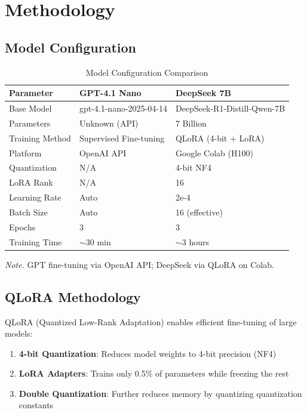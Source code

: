 \documentclass[11pt, a4paper]{article}
\begin{document}
\section{Methodology}

\subsection{Model Configuration}

\begin{table}[H]
\centering
\caption{Model Configuration Comparison}
\label{tab:model_config}
\begin{tabular}{lll}
\toprule
\textbf{Parameter} & \textbf{GPT-4.1 Nano} & \textbf{DeepSeek 7B} \\
\midrule
Base Model & gpt-4.1-nano-2025-04-14 & DeepSeek-R1-Distill-Qwen-7B \\
Parameters & Unknown (API) & 7 Billion \\
Training Method & Supervised Fine-tuning & QLoRA (4-bit + LoRA) \\
Platform & OpenAI API & Google Colab (H100) \\
Quantization & N/A & 4-bit NF4 \\
LoRA Rank & N/A & 16 \\
Learning Rate & Auto & 2e-4 \\
Batch Size & Auto & 16 (effective) \\
Epochs & 3 & 3 \\
Training Time & $\sim$30 min & $\sim$3 hours \\
\bottomrule
\end{tabular}

\vspace{0.5em}
\footnotesize\textit{Note.} GPT fine-tuning via OpenAI API; DeepSeek via QLoRA on Colab.
\end{table}

\subsection{QLoRA Methodology}

QLoRA (Quantized Low-Rank Adaptation) enables efficient fine-tuning of large models:

\begin{enumerate}
    \item \textbf{4-bit Quantization}: Reduces model weights to 4-bit precision (NF4)
    \item \textbf{LoRA Adapters}: Trains only 0.5\% of parameters while freezing the rest
    \item \textbf{Double Quantization}: Further reduces memory by quantizing quantization constants
\end{enumerate}
\end{document}
